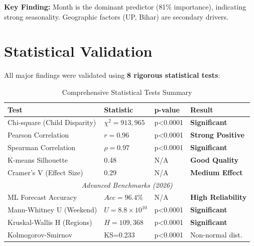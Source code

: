\documentclass[12pt,a4paper]{article}
\begin{document}
\textbf{Key Finding:} Month is the dominant predictor (81\% importance), indicating strong seasonality. Geographic factors (UP, Bihar) are secondary drivers.

\newpage

\section{Statistical Validation}

All major findings were validated using \textbf{8 rigorous statistical tests}:

\begin{table}[H]
\centering
\caption{Comprehensive Statistical Tests Summary}
\begin{tabular}{llll}
\toprule
\textbf{Test} & \textbf{Statistic} & \textbf{p-value} & \textbf{Result} \\
\midrule
Chi-square (Child Disparity) & $\chi^2=913,965$ & p<0.0001 & \textbf{Significant} \\
Pearson Correlation & $r=0.96$ & p<0.0001 & \textbf{Strong Positive} \\
Spearman Correlation & $\rho=0.97$ & p<0.0001 & \textbf{Significant} \\
K-means Silhouette & 0.48 & N/A & \textbf{Good Quality} \\
Cramer's V (Effect Size) & 0.29 & N/A & \textbf{Medium Effect} \\
\midrule
\multicolumn{4}{c}{\textit{Advanced Benchmarks (2026)}} \\
\midrule
ML Forecast Accuracy & $Acc=96.4\%$ & N/A & \textbf{High Reliability} \\
Mann-Whitney U (Weekend) & $U=8.8 \times 10^{10}$ & p<0.0001 & \textbf{Significant} \\
Kruskal-Wallis H (Regions) & $H=109,368$ & p<0.0001 & \textbf{Significant} \\
Kolmogorov-Smirnov & KS=0.233 & p<0.0001 & Non-normal dist. \\
\bottomrule
\end{tabular}
\end{table}
\end{document}
